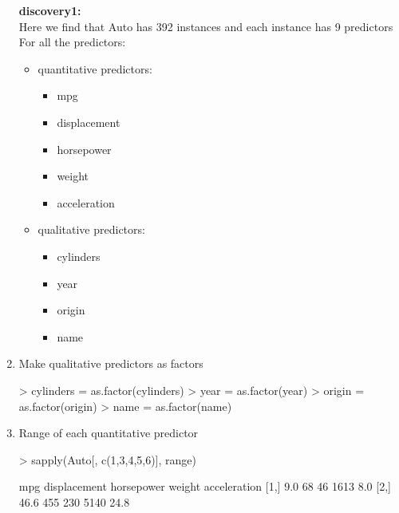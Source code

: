 \documentclass[a4paper]{article}
\begin{document}
\begin{enumerate}
{
\colorbox{BurntOrange}{\textbf{discovery1:}}\color{red}\\
Here we find that Auto has 392 instances and each instance has 9 predictors\\
For all the predictors:
\begin{itemize}
\item quantitative predictors:
\begin{itemize}
\item mpg
\item displacement
\item horsepower
\item weight
\item acceleration
\end{itemize}

\item qualitative predictors:
\begin{itemize}
\item cylinders
\item year
\item origin
\item name
\end{itemize}

\end{itemize}
}

\item Make qualitative predictors as factors
\begin{Schunk}
\begin{Sinput}
> cylinders = as.factor(cylinders)
> year = as.factor(year)
> origin = as.factor(origin)
> name = as.factor(name)
\end{Sinput}
\end{Schunk}

\item Range of each quantitative predictor
\begin{Schunk}
\begin{Sinput}
> sapply(Auto[, c(1,3,4,5,6)], range)
\end{Sinput}
\begin{Soutput}
      mpg displacement horsepower weight acceleration
[1,]  9.0           68         46   1613          8.0
[2,] 46.6          455        230   5140         24.8
\end{Soutput}
\end{Schunk}



\end{enumerate}
\end{document}

